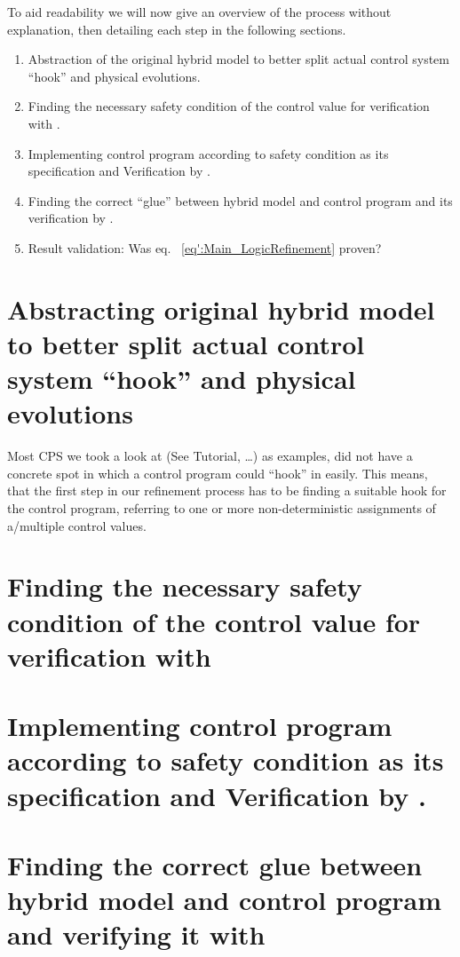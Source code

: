 To aid readability we will now give an overview of the process without explanation, then detailing each step in the following sections. 

\begin{enumerate}
\item Abstraction of the original hybrid model to better split actual control system ``hook'' and physical evolutions.
\item Finding the necessary safety condition of the control value for verification with \keym.
\item Implementing control program according to safety condition as its specification and Verification by \key.
\item Finding the correct ``glue'' between hybrid model and control program and its verification by \keym.
\item Result validation: Was eq. ~\ref{eq':Main_LogicRefinement} proven?
\end{enumerate}

\section{Abstracting original hybrid model to better split actual control system ``hook'' and physical evolutions}
\label{sec:Process:Hook}
Most CPS we took a look at (See \cite{keymaera} Tutorial, \cite[p.~5, p.~11]{platzer2010b} \dots) as examples, did not have a concrete spot in which a control program could ``hook'' in easily. This means, that the first step in our refinement process has to be finding a suitable hook for the control program, referring to one or more non-deterministic assignments of a/multiple control values.

\section{Finding the necessary safety condition of the control value for verification with \keym}
\label{sec:Process:SafetyCond}

\section{Implementing control program according to safety condition as its specification and Verification by \key.}
\label{sec:Process:Implementation}

\section{Finding the correct glue between hybrid model and control program and verifying it with \keym}
\label{sec:Process:Glue}

